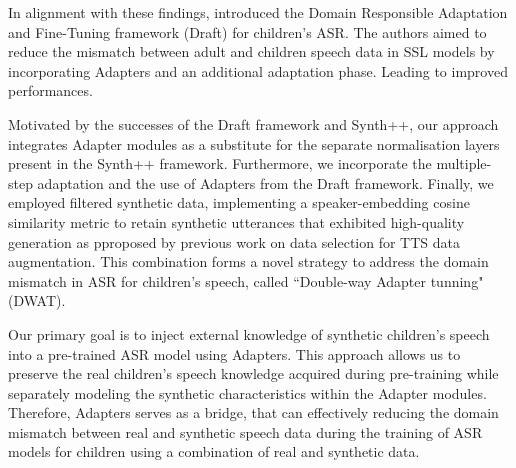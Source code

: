 In alignment with these findings, \cite{fan2022draft} introduced the Domain Responsible Adaptation and Fine-Tuning framework (Draft) for children's ASR. The authors aimed to reduce the mismatch between adult and children speech data in SSL models by incorporating Adapters and an additional adaptation phase. Leading to improved performances.

Motivated by the successes of the Draft framework and Synth++, our approach integrates Adapter modules as a substitute for the separate normalisation layers present in the Synth++ framework. Furthermore, we incorporate the multiple-step adaptation and the use of Adapters from the Draft framework. Finally, we employed filtered synthetic data, implementing a speaker-embedding cosine similarity metric to retain synthetic utterances that exhibited high-quality generation as pproposed by previous work on data selection for TTS data augmentation. This combination forms a novel strategy to address the domain mismatch in ASR for children's speech, called ``Double-way Adapter tunning" (DWAT). 


Our primary goal is to inject external knowledge of synthetic children's speech into a pre-trained ASR model using Adapters. This approach allows us to preserve the real children's speech knowledge acquired during pre-training while separately modeling the synthetic characteristics within the Adapter modules. Therefore, Adapters serves as a bridge, that can effectively reducing the domain mismatch between real and synthetic speech data during the training of ASR models for children using a combination of real and synthetic data. 

